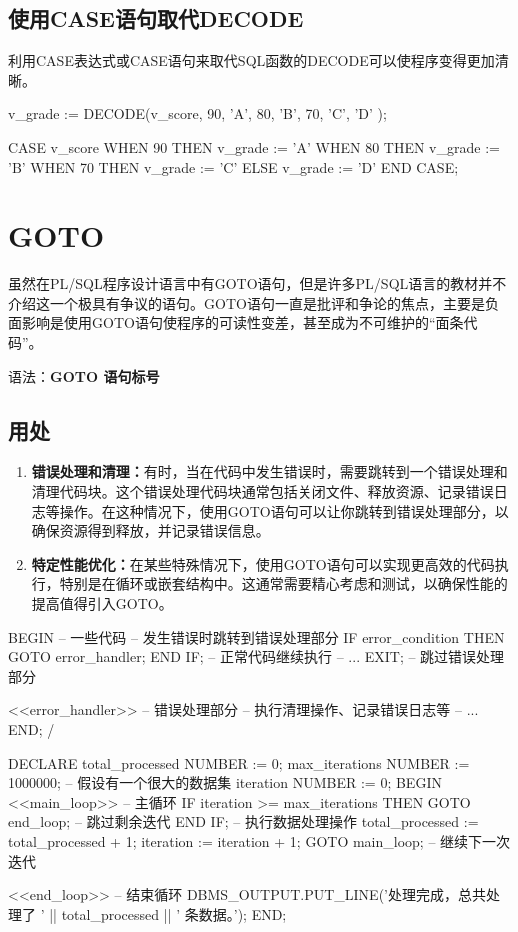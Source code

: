 \documentclass[11pt, a4paper, oneside, UTF8]{ctexbook}
\let\kaishu\relax %
\begin{document}
\subsection{使用CASE语句取代DECODE}
利用CASE表达式或CASE语句来取代SQL函数的DECODE可以使程序变得更加清晰。
\begin{plsql}[caption=DECODE函数]
v_grade := DECODE(v_score,
  90, 'A',
  80, 'B',
  70, 'C',
  'D'
);
\end{plsql}
\begin{plsql}[caption=CASE表达式]
CASE v_score
  WHEN 90 THEN v_grade := 'A'
  WHEN 80 THEN v_grade := 'B'
  WHEN 70 THEN v_grade := 'C'
  ELSE v_grade := 'D'
END CASE;
\end{plsql}

\section{GOTO}
虽然在PL/SQL程序设计语言中有GOTO语句，但是许多PL/SQL语言的教材并不介绍这一个极具有争议的语句。GOTO语句一直是批评和争论的焦点，主要是负面影响是使用GOTO语句使程序的可读性变差，甚至成为不可维护的“面条代码”。

语法：{\bfseries\kaishu GOTO 语句标号}

\subsection{用处}
\begin{enumerate}
  \item {\bfseries\kaishu 错误处理和清理：}有时，当在代码中发生错误时，需要跳转到一个错误处理和清理代码块。这个错误处理代码块通常包括关闭文件、释放资源、记录错误日志等操作。在这种情况下，使用GOTO语句可以让你跳转到错误处理部分，以确保资源得到释放，并记录错误信息。
  \item {\bfseries\kaishu 特定性能优化：}在某些特殊情况下，使用GOTO语句可以实现更高效的代码执行，特别是在循环或嵌套结构中。这通常需要精心考虑和测试，以确保性能的提高值得引入GOTO。
\end{enumerate}
\begin{plsql}[caption=错误处理示例代码]
BEGIN
  -- 一些代码
  -- 发生错误时跳转到错误处理部分
  IF error_condition THEN
    GOTO error_handler;
  END IF;
  -- 正常代码继续执行
  -- ...
  EXIT; -- 跳过错误处理部分
  
  <<error_handler>> -- 错误处理部分
  -- 执行清理操作、记录错误日志等
  -- ...
END;
/
\end{plsql}

\begin{plsql}[caption=性能提升示例代码（循环）]
DECLARE
  total_processed NUMBER := 0;
  max_iterations NUMBER := 1000000; -- 假设有一个很大的数据集
  iteration NUMBER := 0;
BEGIN
  <<main_loop>> -- 主循环
  IF iteration >= max_iterations THEN
    GOTO end_loop; -- 跳过剩余迭代
  END IF;
  -- 执行数据处理操作
  total_processed := total_processed + 1;
  iteration := iteration + 1;
  GOTO main_loop; -- 继续下一次迭代

  <<end_loop>> -- 结束循环
  DBMS_OUTPUT.PUT_LINE('处理完成，总共处理了 ' || total_processed || ' 条数据。');
END;
\end{plsql}
\end{document}
